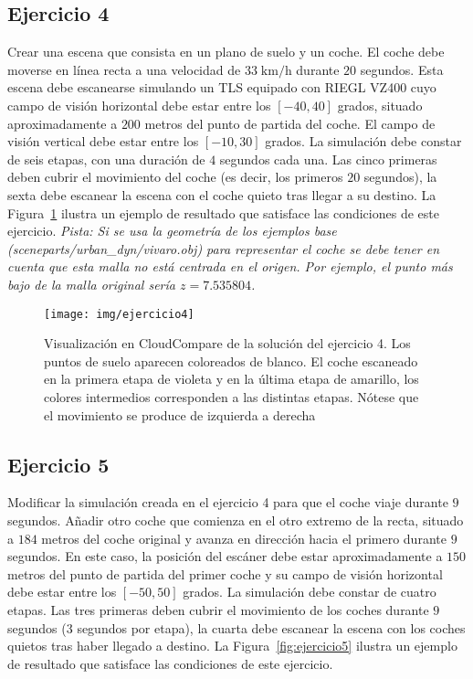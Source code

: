 \documentclass[]{article}
\begin{document}
	\pagebreak
	

	\subsection*{Ejercicio 4}
	Crear una escena que consista en un plano de suelo y un coche. El coche debe moverse en línea recta a una velocidad de $33 \;\mathrm{km}/\mathrm{h}$ durante $20$ segundos. Esta escena debe escanearse simulando un TLS equipado con RIEGL VZ400 cuyo campo de visión horizontal debe estar entre los $[-40, 40]$ grados, situado aproximadamente a $200$ metros del punto de partida del coche. El campo de visión vertical debe estar entre los $[-10, 30]$ grados. La simulación debe constar de seis etapas, con una duración de $4$ segundos cada una. Las cinco primeras deben cubrir el movimiento del coche (es decir, los primeros $20$ segundos), la sexta debe escanear la escena con el coche quieto tras llegar a su destino. La Figura~\ref{fig:ejercicio4} ilustra un ejemplo de resultado que satisface las condiciones de este ejercicio. \textit{Pista: Si se usa la geometría de los ejemplos base (sceneparts/urban\_dyn/vivaro.obj) para representar el coche se debe tener en cuenta que esta malla no está centrada en el origen. Por ejemplo, el punto más bajo de la malla original sería $z=7.535804$.}

	\begin{figure}[htb]
		\centering
		\texttt{[image: img/ejercicio4]}
		\caption{Visualización en CloudCompare de la solución del ejercicio 4. Los puntos de suelo aparecen coloreados de blanco. El coche escaneado en la primera etapa de violeta y en la última etapa de amarillo, los colores intermedios corresponden a las distintas etapas. Nótese que el movimiento se produce de izquierda a derecha}
		\label{fig:ejercicio4}
	\end{figure} 
	
	\pagebreak
	
	
	\subsection*{Ejercicio 5}
	Modificar la simulación creada en el ejercicio 4 para que el coche viaje durante $9$ segundos. Añadir otro coche que comienza en el otro extremo de la recta, situado a $184$ metros del coche original y avanza en dirección hacia el primero durante $9$ segundos. En este caso, la posición del escáner debe estar aproximadamente a $150$ metros del punto de partida del primer coche y su campo de visión horizontal debe estar entre los $[-50, 50]$ grados. La simulación debe constar de cuatro etapas. Las tres primeras deben cubrir el movimiento de los coches durante $9$ segundos ($3$ segundos por etapa), la cuarta debe escanear la escena con los coches quietos tras haber llegado a destino. La Figura~\ref{fig:ejercicio5} ilustra un ejemplo de resultado que satisface las condiciones de este ejercicio.
	
\end{document}
